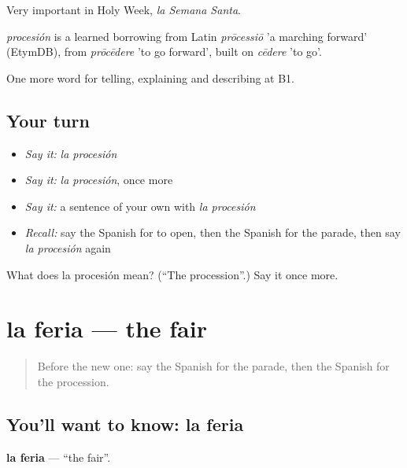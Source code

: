 Very important in Holy Week, \emph{la Semana Santa}.

\begin{cousinweb}
\emph{procesión} is a learned borrowing from Latin \emph{prōcessiō} 'a marching forward' (EtymDB), from \emph{prōcēdere} 'to go forward', built on \emph{cēdere} 'to go'.
\end{cousinweb}

\begin{grammarlens}[title={What you've built}]
One more word for telling, explaining and describing at B1.
\end{grammarlens}

\subsection*{Your turn}
\begin{itemize}
\raggedright
  \item \emph{Say it:} \emph{la procesión}
  \item \emph{Say it:} \emph{la procesión}, once more
  \item \emph{Say it:} a sentence of your own with \emph{la procesión}
  \item \emph{Recall:} say the Spanish for to open, then the Spanish for the parade, then say \emph{la procesión} again
\end{itemize}

\begin{tcolorbox}[breakable,colback=teal!4,colframe=teal!35!black,title={Before you move on}]
What does la procesión mean? (\textquotedblleft{}The procession\textquotedblright{}.) Say it once more.
\end{tcolorbox}
\section[la feria]{la feria — the fair}

\label{lesson:ES-C559-feria}



\begin{quote}
Before the new one: say the Spanish for the parade, then the Spanish for the procession.
\end{quote}

\subsection*{You'll want to know: la feria}
\textbf{la feria} — \textquotedblleft{}the fair\textquotedblright{}.

